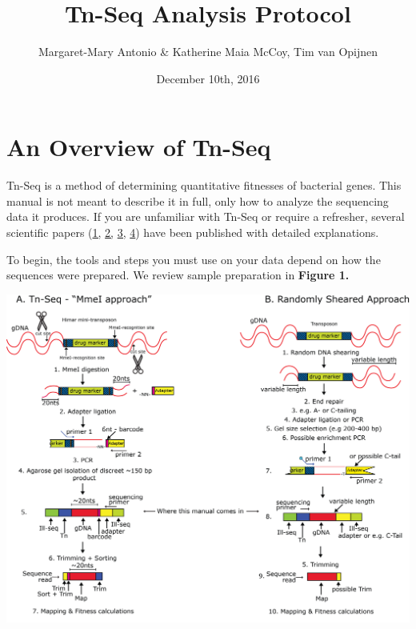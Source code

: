 \documentclass{article}
\begin{document}
\title{Tn-Seq Analysis Protocol}
\author{Margaret-Mary Antonio \& Katherine Maia McCoy, Tim van Opijnen}
\date{December 10th, 2016}
\maketitle

\newpage

\section{An Overview of Tn-Seq}

\vspace{2 mm}

\noindent
Tn-Seq is a method of determining quantitative fitnesses of bacterial genes. This manual is not meant to describe it in full, only how to analyze the sequencing data it produces. If you are unfamiliar with Tn-Seq or require a refresher, several scientific papers (\href{http://www.nature.com/nmeth/journal/v6/n10/abs/nmeth.1377.html}{1,} \href{http://www.nature.com/nrmicro/journal/v11/n7/abs/nrmicro3033.html}{2,} \href{http://www.ncbi.nlm.nih.gov/pmc/articles/PMC3514683/}{3,} \href{http://journals.plos.org/plospathogens/article?id=10.1371/journal.ppat.1005869}{4}) have been published with detailed explanations.

\vspace{5 mm}

\noindent
To begin, the tools and steps you must use on your data depend on how the sequences were prepared. We review sample preparation in \textbf{Figure 1.} 

\vspace{7 mm}

\noindent
\includegraphics[scale=0.87]{SeqProdOverview.png}
\end{document}
